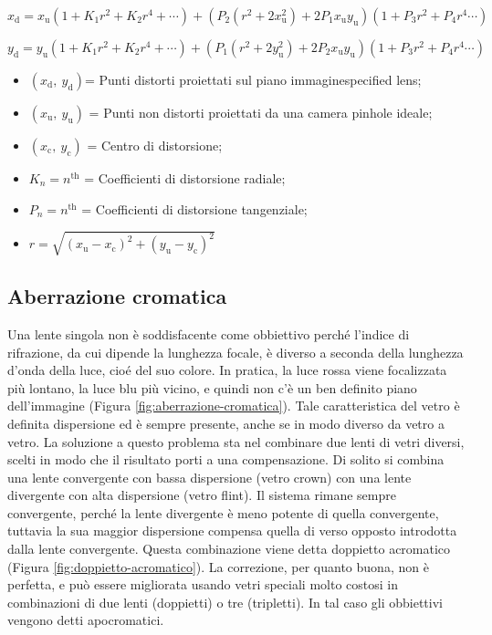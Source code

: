 \[
 x_\mathrm{d} = x_\mathrm{u}(1 + K_1r^2 + K_2r^4 + \cdots) + 
(P_2(r^2 + 2x_\mathrm{u}^2) + 2P_1 x_\mathrm{u}y_\mathrm{u})(1 + P_3r^2 + P_4r^4 \cdots) \]

\[y_\mathrm{d} = y_\mathrm{u}(1 + K_1r^2 + K_2r^4 + \cdots) + 
(P_1(r^2 + 2y_\mathrm{u}^2) + 2P_2 x_\mathrm{u}y_\mathrm{u})(1 + P_3r^2 + P_4r^4 \cdots)
\]

\begin{itemize}

\item $(x_\mathrm{d},\ y_\mathrm{d})$=  Punti distorti proiettati sul piano immaginespecified lens;
\item $(x_\mathrm{u},\ y_\mathrm{u})$ = Punti non distorti proiettati da una camera pinhole ideale;
\item $(x_\mathrm{c},\ y_\mathrm{c})$ = Centro di distorsione;
\item $K_n = n^{\mathrm{th}}$ = Coefficienti di distorsione radiale;
\item $P_n = n^{\mathrm{th}}$ = Coefficienti di distorsione tangenziale;
\item $r = \sqrt{(x_\mathrm{u}-x_\mathrm{c})^2 + (y_\mathrm{u}-y_\mathrm{c})^2}$
\end{itemize}


\subsection{Aberrazione cromatica}

Una lente singola non è soddisfacente come obbiettivo perché l'indice di rifrazione, da
cui dipende la lunghezza focale, è diverso a seconda della lunghezza d'onda della luce, cioé del suo
colore. In pratica, la luce rossa viene focalizzata più lontano, la luce blu più vicino, e quindi non c'è
un ben definito piano dell'immagine (Figura \ref{fig:aberrazione-cromatica}). Tale caratteristica del vetro è definita dispersione
ed è sempre presente, anche se in modo diverso da vetro a vetro. La soluzione a questo problema sta
nel combinare due lenti di vetri diversi, scelti in modo che il risultato porti a una compensazione. Di solito si combina una lente convergente con bassa dispersione (vetro crown) con una lente divergente con alta dispersione (vetro flint). Il sistema rimane sempre convergente, perché la lente divergente è meno potente di quella convergente, tuttavia la sua maggior dispersione compensa quella di verso opposto introdotta dalla lente convergente. Questa combinazione viene detta doppietto acromatico (Figura \ref{fig:doppietto-acromatico}). La correzione, per quanto buona, non è perfetta, e può essere migliorata usando vetri speciali molto costosi in combinazioni di due lenti (doppietti) o tre (tripletti). In tal caso gli obbiettivi vengono detti apocromatici.



